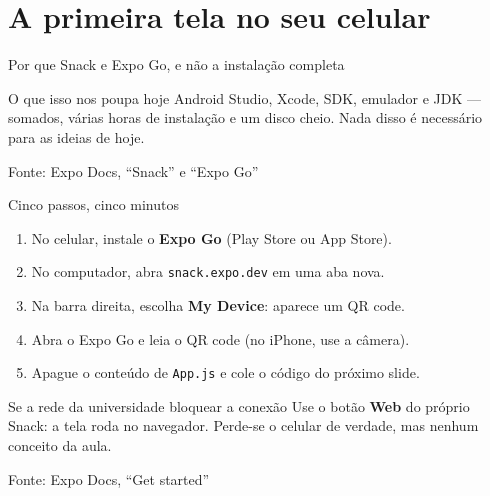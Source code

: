 \documentclass[aspectratio=169]{beamer}
\newcommand{\fonte}[1]{\vfill\hfill{\scriptsize\textcolor{UFSGray}{Fonte: #1}}}
\begin{document}
\section{A primeira tela no seu celular}

\begin{frame}{Por que Snack e Expo Go, e não a instalação completa}
  \begin{center}
  \end{center}
  \begin{block}{O que isso nos poupa hoje}
    Android Studio, Xcode, SDK, emulador e JDK --- somados, várias horas de
    instalação e um disco cheio. Nada disso é necessário para as ideias de hoje.
  \end{block}
  \fonte{Expo Docs, ``Snack'' e ``Expo Go''~\cite{expo2025docs}}
\end{frame}

\begin{frame}{Cinco passos, cinco minutos}
  \begin{enumerate}
    \item No celular, instale o \textbf{Expo Go} (Play Store ou App Store).
    \item No computador, abra \texttt{snack.expo.dev} em uma aba nova.
    \item Na barra direita, escolha \textbf{My Device}: aparece um QR code.
    \item Abra o Expo Go e leia o QR code (no iPhone, use a câmera).
    \item Apague o conteúdo de \texttt{App.js} e cole o código do próximo slide.
  \end{enumerate}
  \begin{alertblock}{Se a rede da universidade bloquear a conexão}
    Use o botão \textbf{Web} do próprio Snack: a tela roda no navegador.
    Perde-se o celular de verdade, mas nenhum conceito da aula.
  \end{alertblock}
  \fonte{Expo Docs, ``Get started''~\cite{expo2025docs}}
\end{frame}
\end{document}
